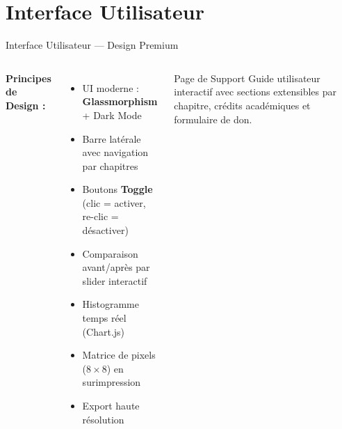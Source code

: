 \documentclass[aspectratio=169, 11pt]{beamer}
\begin{document}
\section{Interface Utilisateur}

\begin{frame}{Interface Utilisateur — Design Premium}
  \begin{columns}[T]
    \textbf{\textcolor{uy1blue}{Principes de Design :}}
    \begin{itemize}
      \item UI moderne : \textbf{Glassmorphism} + Dark Mode
      \item Barre latérale avec navigation par chapitres
      \item Boutons \textbf{Toggle} (clic = activer, re-clic = désactiver)
      \item Comparaison avant/après par slider interactif
      \item Histogramme temps réel (Chart.js)
      \item Matrice de pixels ($8\times8$) en surimpression
      \item Export haute résolution
    \end{itemize}
    \vspace{4pt}
    \begin{exampleblock}{Page de Support}
      Guide utilisateur interactif avec sections extensibles par chapitre, crédits académiques et formulaire de don.
    \end{exampleblock}

  \end{columns}
\end{frame}
\end{document}
